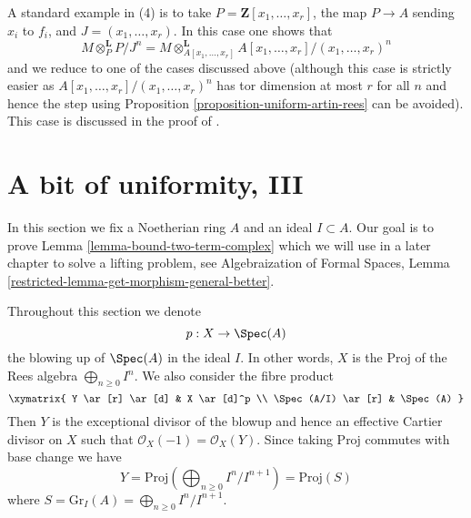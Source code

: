 \begin{remark}
\medskip\noindent
A standard example in (4) is to take $P = \mathbf{Z}[x_1, \ldots, x_r]$,
the map $P \to A$ sending $x_i$ to $f_i$, and $J = (x_1, \ldots, x_r)$.
In this case one shows that
$$
M \otimes_P^\mathbf{L} P/J^n =
M \otimes_{A[x_1, \ldots, x_r]}^\mathbf{L}
A[x_1, \ldots, x_r]/(x_1, \ldots, x_r)^n
$$
and we reduce to one of the cases discussed above (although this case
is strictly easier as $A[x_1, \ldots, x_r]/(x_1, \ldots, x_r)^n$ has
tor dimension at most $r$ for all $n$ and hence the step using
Proposition \ref{proposition-uniform-artin-rees} can be avoided).
This case is discussed in the proof of \cite[Proposition 3.5.1]{BS}.
\end{remark}








\section{A bit of uniformity, III}
\label{section-uniform}

\noindent
In this section we fix a Noetherian ring $A$ and an ideal $I \subset A$.
Our goal is to prove Lemma \ref{lemma-bound-two-term-complex} which we will
use in a later chapter to solve a lifting problem, see
Algebraization of Formal Spaces, Lemma
\ref{restricted-lemma-get-morphism-general-better}.

\medskip\noindent
Throughout this section we denote
$$
p : X \to \Spec(A)
$$
the blowing up of $\Spec(A)$ in the ideal $I$. In other words, $X$ is the
$\text{Proj}$ of the Rees algebra $\bigoplus_{n \geq 0} I^n$. We also consider
the fibre product
$$
\xymatrix{
Y \ar[r] \ar[d] & X \ar[d]^p \\
\Spec(A/I) \ar[r] & \Spec(A)
}
$$
Then $Y$ is the exceptional divisor of the blowup and hence
an effective Cartier divisor on $X$ such that
$\mathcal{O}_X(-1) = \mathcal{O}_X(Y)$. Since taking $\text{Proj}$
commutes with base change we have
$$
Y = \text{Proj}(\bigoplus\nolimits_{n \geq 0} I^n/I^{n + 1}) = \text{Proj}(S)
$$
where $S = \text{Gr}_I(A) = \bigoplus_{n \geq 0} I^n/I^{n + 1}$.

